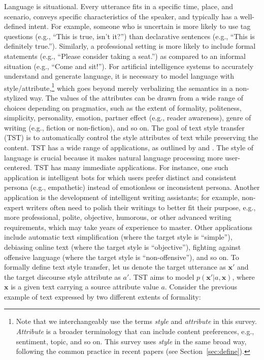 

\label{sec:intro}
Language is situational. Every utterance fits in a specific time, place, and scenario, conveys specific characteristics of the speaker, and typically has a well-defined intent. 
For example, someone who is uncertain is more likely to use tag questions (e.g., “This is true, isn’t it?”) than declarative sentences (e.g., “This is definitely true.”). Similarly, a professional setting is more likely to include formal statements (e.g., “Please consider taking a seat.”) as compared to an informal situation (e.g., “Come and sit!”). For artificial intelligence systems to accurately understand and generate language, it is necessary to model language with style/attribute,\footnote{Note that we interchangeably use the terms \textit{style} and \textit{attribute} in this survey. \textit{Attribute} is a broader terminology that can include content preferences, e.g., sentiment, topic, and so on. This survey uses \textit{style} in the same broad way, following the common practice in recent papers (see Section~\ref{sec:define}).} which goes beyond merely verbalizing the semantics in a non-stylized way.
The values of the attributes can be drawn from a wide range of choices depending on pragmatics, such as the extent of formality, politeness, simplicity, personality, emotion,
partner effect (e.g., reader awareness), genre of writing (e.g., fiction or non-fiction), and so on. 
The goal of text style transfer (TST) is  to automatically control the style attributes of text while preserving the content. TST has a wide range of applications, as outlined by  and . The style of language is crucial because it makes natural language processing more user-centered. TST has many immediate applications. For instance, one such application is intelligent bots for which users prefer distinct and consistent persona (e.g., empathetic) instead of emotionless or inconsistent persona.
Another application is the development of intelligent writing assistants; for example, non-expert writers often need to polish their writings to better fit their purpose, e.g., more professional, polite, objective, humorous, or other advanced writing requirements, which may take years of experience to master. Other applications include automatic text simplification (where the target style is “simple”), debiasing online text (where the target style is “objective”), fighting against offensive language (where the target style is “non-offensive”), and so on.
To formally define text style transfer, let us denote the target utterance as $\bm{x}'$ and the target discourse style attribute as $a'$. TST aims to model $p(\bm{x}'|a,\bm{x})$, where $\bm{x}$ is a given text carrying a source attribute value $a$. Consider the previous example of text expressed by two different extents of formality:
